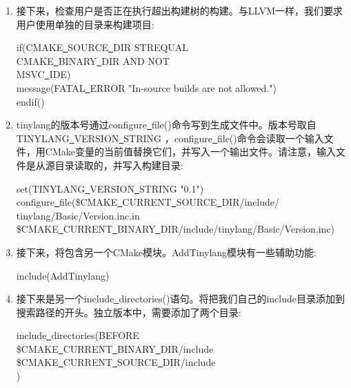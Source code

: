 \begin{enumerate}
\item 接下来，检查用户是否正在执行超出构建树的构建。与LLVM一样，我们要求用户使用单独的目录来构建项目:
\begin{tcolorbox}[colback=white,colframe=black]
if(CMAKE\underline{~}SOURCE\underline{~}DIR STREQUAL \\  \hspace*{0.3cm}CMAKE\underline{~}BINARY\underline{~}DIR AND NOT \\ \hspace*{0.3cm}MSVC\underline{~}IDE) \\
	\hspace*{0.5cm}message(FATAL\underline{~}ERROR "In-source builds are not allowed.") \\
endif()
\end{tcolorbox}
 
\item tinylang的版本号通过configure\underline{~}file()命令写到生成文件中。版本号取自TINYLANG\underline{~}VER\allowbreak SION\underline{~}STRING ，configure\underline{~}file()命令会读取一个输入文件，用CMake变量的当前值替换它们，并写入一个输出文件。请注意，输入文件是从源目录读取的，并写入构建目录:
\begin{tcolorbox}[colback=white,colframe=black]
set(TINYLANG\underline{~}VERSION\underline{~}STRING "0.1") \\
	configure\underline{~}file(\${CMAKE\underline{~}CURRENT\underline{~}SOURCE\underline{~}DIR}/include/ \\
	\hspace*{0.5cm}tinylang/Basic/Version.inc.in \\
\${CMAKE\underline{~}CURRENT\underline{~}BINARY\underline{~}DIR}/include/tinylang/Basic/Version.inc)
\end{tcolorbox}

\item 接下来，将包含另一个CMake模块。AddTinylang模块有一些辅助功能:
\begin{tcolorbox}[colback=white,colframe=black]
	include(AddTinylang)
\end{tcolorbox}
 
\item 接下来是另一个include\underline{~}directories()语句。将把我们自己的include目录添加到搜索路径的开头。独立版本中，需要添加了两个目录:
\begin{tcolorbox}[colback=white,colframe=black]
include\underline{~}directories(BEFORE \\
\hspace*{0.5cm}\${CMAKE\underline{~}CURRENT\underline{~}BINARY\underline{~}DIR}/include \\
\hspace*{0.5cm}\${CMAKE\underline{~}CURRENT\underline{~}SOURCE\underline{~}DIR}/include \\
)
\end{tcolorbox}
 

\end{enumerate}
